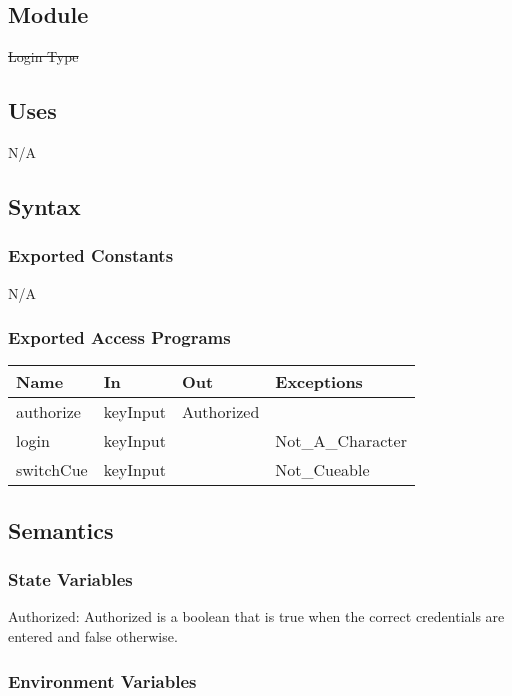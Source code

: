 \documentclass[12pt, titlepage]{article}
\begin{document}
\subsection{Module}

\sout{Login Type}

\subsection{Uses}
N/A

\subsection{Syntax}

\subsubsection{Exported Constants}
N/A

\subsubsection{Exported Access Programs}

\begin{center}
\begin{tabular}{p{4cm} p{4cm} p{4cm} p{4cm}}
\hline
\textbf{Name} & \textbf{In} & \textbf{Out} & \textbf{Exceptions} \\
\hline
authorize & keyInput & Authorized & \\
\hline
login & keyInput &  & Not\_A\_Character \\
\hline
switchCue & keyInput &  & Not\_Cueable \\
\hline
\end{tabular}
\end{center}

\subsection{Semantics}

\subsubsection{State Variables}

Authorized: Authorized is a boolean that is true when the correct credentials are entered and false otherwise.

\subsubsection{Environment Variables}
\end{document}
